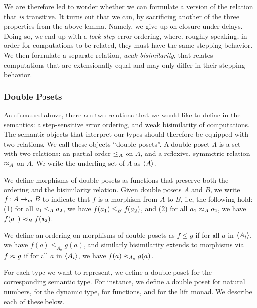 
We are therefore led to wonder whether we can formulate a version of the relation
that \emph{is} transitive.
It turns out that we can, by sacrificing another of the three properties from
the above lemma. Namely, we give up on closure under delays. Doing so, we end up
with a \emph{lock-step} error ordering, where, roughly speaking, in order for
computations to be related, they must have the same stepping behavior.
%
We then formulate a separate relation, \emph{weak bisimilarity}, that relates computations
that are extensionally equal and may only differ in their stepping behavior.



\subsubsection{Double Posets}\label{sec:predomains}

As discussed above, there are two relations that we would like to define
in the semantics: a step-sensitive error ordering, and weak bisimilarity of computations.
%
The semantic objects that interpret our types should therefore be equipped with
two relations. We call these objects ``double posets''.
A double poset $A$ is a set with two relations: an partial order $\le_A$ on $A$, and
a reflexive, symmetric relation $\approx_A$ on $A$.
We write the underling set of $A$ as $\langle {A} \rangle$.

We define morphisms of double posets as functions that preserve both
the ordering and the bisimilarity relation. Given double posets
$A$ and $B$, we write $f \colon A \to_m B$ to indicate that $f$ is a morphism
from $A$ to $B$, i.e, the following hold:
(1) for all $a_1 \le_A a_2$, we have $f(a_1) \le_{B} f(a_2)$, and
(2) for all $a_1 \approx_A a_2$, we have $f(a_1) \approx_{B} f(a_2)$.



We define an ordering on morphisms of double posets as
$f \le g$ if for all $a$ in $\langle {A_i} \rangle$, we have $f(a) \le_{A_o} g(a)$,
and similarly bisimilarity extends to morphisms via
$f \approx g$ if for all $a$ in $\langle {A_i} \rangle$, we have $f(a) \approx_{A_o} g(a)$.

For each type we want to represent, we define a double poset for the corresponding semantic
type. For instance, we define a double poset for natural numbers, for the
dynamic type, for functions, and for the lift monad. We
describe each of these below.

